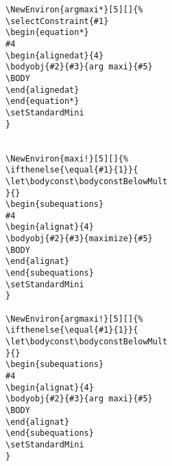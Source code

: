 \documentclass[]{report}
\begin{document}
\begin{verbatim}
\NewEnviron{argmaxi*}[5][]{%
\selectConstraint{#1}
\begin{equation*}
#4
\begin{alignedat}{4}
\bodyobj{#2}{#3}{arg maxi}{#5}
\BODY
\end{alignedat}
\end{equation*}
\setStandardMini
}


\NewEnviron{maxi!}[5][]{%
\ifthenelse{\equal{#1}{1}}{
\let\bodyconst\bodyconstBelowMult
}{}
\begin{subequations}
#4
\begin{alignat}{4}
\bodyobj{#2}{#3}{maximize}{#5}		
\BODY
\end{alignat}
\end{subequations}	
\setStandardMini		
}

\NewEnviron{argmaxi!}[5][]{%
\ifthenelse{\equal{#1}{1}}{
\let\bodyconst\bodyconstBelowMult
}{}
\begin{subequations}
#4
\begin{alignat}{4}
\bodyobj{#2}{#3}{arg maxi}{#5}		
\BODY
\end{alignat}
\end{subequations}
\setStandardMini			
}
\end{verbatim}
\end{document}
